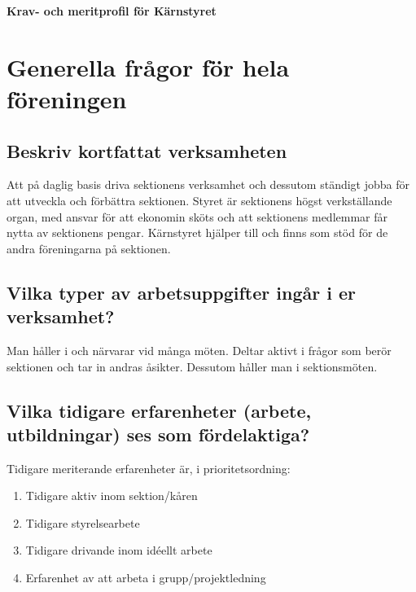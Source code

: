 \documentclass[a4paper]{article}
\begin{document}
\begin{center}
\Huge{\bf{Krav- och meritprofil för Kärnstyret}}
\end{center}
\section*{Generella frågor för hela föreningen}
\subsection*{Beskriv kortfattat verksamheten}
Att på daglig basis driva sektionens verksamhet och dessutom ständigt jobba för att utveckla och förbättra sektionen. Styret är sektionens högst verkställande organ, med ansvar för att ekonomin sköts och att sektionens medlemmar får nytta av sektionens pengar. Kärnstyret hjälper till och finns som stöd för de andra föreningarna på sektionen.

\subsection*{Vilka typer av arbetsuppgifter ingår i er verksamhet?}
Man håller i och närvarar vid många möten. Deltar aktivt i frågor som berör sektionen och tar in andras åsikter. Dessutom håller man i sektionsmöten.

\subsection*{Vilka tidigare erfarenheter (arbete, utbildningar) ses som fördelaktiga?}
Tidigare meriterande erfarenheter är, i prioritetsordning:
\begin{enumerate}
\item Tidigare aktiv inom sektion/kåren
\item Tidigare styrelsearbete
\item Tidigare drivande inom idéellt arbete
\item Erfarenhet av att arbeta i grupp/projektledning
\end{enumerate}
\end{document}
